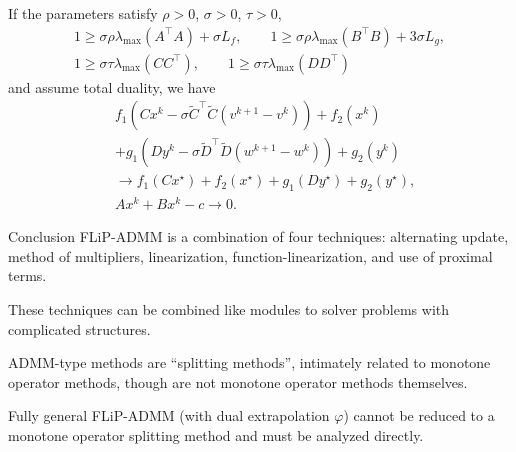 \documentclass[10pt,mathserif]{beamer}
\begin{document}
\begin{frame}
If the parameters satisfy $\rho>0$, $\sigma>0$, $\tau>0$,
\begin{gather*}
1\ge \sigma\rho \lambda_\mathrm{max}(A^\intercal  A)+\sigma L_f,\qquad
1\ge \sigma\rho \lambda_\mathrm{max}(B^\intercal  B)+3\sigma L_g,\\
1\ge \sigma\tau \lambda_\mathrm{max}(CC^\intercal ),\qquad
1\ge \sigma\tau \lambda_\mathrm{max}(DD^\intercal )
\end{gather*}
and assume total duality, we have
\begin{align*}
  &f_1\left(Cx^{k}-\sigma \tilde{C}^\intercal \tilde{C}(v^{k+1}-v^{k})\right)+f_2(x^{k}) \\
  & +g_1\left(Dy^{k}-\sigma \tilde{D}^\intercal \tilde{D}(w^{k+1}-w^{k})\right)+g_2(y^{k})\\
 &\rightarrow f_1(Cx^\star)+f_2(x^\star)+g_1(Dy^\star)+g_2(y^\star),\\[5pt]
& Ax^k+Bx^k-c\rightarrow 0.
\end{align*}
\end{frame}


\begin{frame}{Conclusion}
FLiP-ADMM is a combination of four techniques: alternating update, method of multipliers, linearization, function-linearization, and use of proximal terms.
\bigskip

These techniques can be combined like modules to solver problems with complicated structures.
\bigskip

ADMM-type methods are ``splitting methods'', intimately related to monotone operator methods, though are not monotone operator methods themselves.
\bigskip

Fully general FLiP-ADMM (with dual extrapolation $\varphi$) cannot be reduced to a monotone operator splitting method and must be analyzed directly.
\end{frame}
\end{document}

